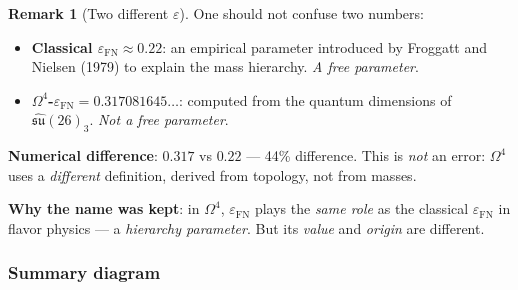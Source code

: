 \documentclass[11pt,a4paper]{article}
\newcommand{\Om}{\ensuremath{\Omega^4}}
\newcommand{\epsFN}{\ensuremath{\varepsilon_{\text{FN}}}}
\theoremstyle{definition}
\newtheorem{remark}[theorem]{Remark}
\begin{document}
\begin{remark}[Two different $\varepsilon$]
\label{rem:two-epsilons}
One should not confuse two numbers:
\begin{itemize}
    \item \textbf{Classical $\varepsilon_{\text{FN}} \approx 0.22$}:
          an empirical parameter introduced by Froggatt and Nielsen
          (1979) to explain the mass hierarchy. \emph{A free parameter}.
    \item \textbf{$\Om$-$\epsFN = 0.317081645\ldots$}:
          computed from the quantum dimensions of $\hat{\mathfrak{su}}(26)_3$.
          \emph{Not a free parameter}.
\end{itemize}

\textbf{Numerical difference}: $0.317$ vs $0.22$ --- 44\% difference.
This is \emph{not} an error: $\Om$ uses a \emph{different}
definition, derived from topology, not from masses.

\textbf{Why the name was kept}: in $\Om$, $\epsFN$
plays the \emph{same role} as the classical $\varepsilon_{\text{FN}}$
in flavor physics --- a \emph{hierarchy parameter}. But its \emph{value}
and \emph{origin} are different.
\end{remark}

\subsubsection{Summary diagram}
\end{document}
